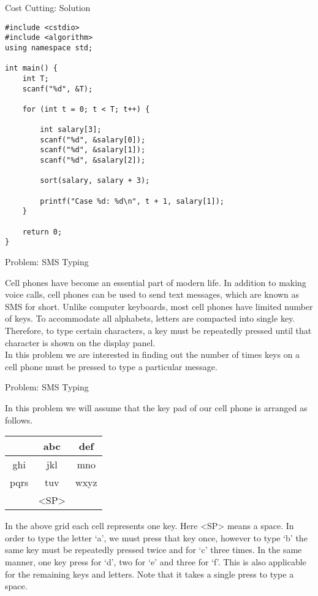 \documentclass[10pt]{beamer}
\begin{document}
\begin{frame}[fragile]{Cost Cutting: Solution}
    \begin{verbatim}
#include <cstdio>
#include <algorithm>
using namespace std;

int main() {
    int T;
    scanf("%d", &T);

    for (int t = 0; t < T; t++) {

        int salary[3];
        scanf("%d", &salary[0]);
        scanf("%d", &salary[1]);
        scanf("%d", &salary[2]);

        sort(salary, salary + 3);

        printf("Case %d: %d\n", t + 1, salary[1]);
    }

    return 0;
}
\end{verbatim}
\end{frame}

\begin{frame}{Problem: SMS Typing}

{\small
   Cell phones have become an essential part of modern life. In addition to
making voice calls, cell phones can be used to send text messages, which
are known as SMS for short. Unlike computer keyboards, most cell phones
have limited number of keys. To accommodate all alphabets, letters are
compacted into single key. Therefore, to type certain characters, a key
must be repeatedly pressed until that character is shown on the display
panel.\\
\vspace{10pt}
In this problem we are interested in finding out the number of times keys on a cell phone must be
pressed to type a particular message.
}
\end{frame}


\begin{frame}{Problem: SMS Typing}

{
    \small
In this problem we will assume that the key pad of our cell phone is arranged as follows.

\begin{center}
    \begin{tabular}{|c|c|c|}
        \hline
         & abc & def \\
        \hline
        ghi & jkl & mno \\
        \hline
        pqrs & tuv & wxyz \\
        \hline
         & <SP> & \\
        \hline
    \end{tabular}
\end{center}

In the above grid each cell represents one key. Here <SP> means a space. In order to type the letter
‘a’, we must press that key once, however to type ‘b’ the same key must be repeatedly pressed twice
and for ‘c’ three times. In the same manner, one key press for ‘d’, two for ‘e’ and three for ‘f’. This is
also applicable for the remaining keys and letters. Note that it takes a single press to type a space.
}

\end{frame}
\end{document}
